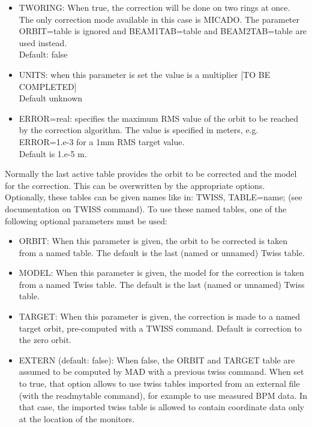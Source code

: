 \begin{itemize}
   \item TWORING: When true, the correction will be done on two rings at
     once. The only correction mode available in this case is
     MICADO. The parameter ORBIT=table is ignored and BEAM1TAB=table and
     BEAM2TAB=table are used instead.  
     \\ Default: false \\

   \item UNITS: when this parameter is set the value is a multiplier [TO BE COMPLETED] 
     \\ Default unknown \\

   \item ERROR=real: specifies the maximum RMS value of the orbit to
     be reached by the correction algorithm. The value is specified in
     meters, e.g. ERROR=1.e-3 for a 1mm RMS target value. \\ Default is
     1.e-5 m.\\

\end{itemize}

Normally the last active table provides the orbit to be
corrected and the model for the correction. This can be overwritten
by the appropriate options. Optionally, these tables can be given
names like in:  TWISS, TABLE=name; (see documentation on TWISS
command). To use these named tables, one of the following optional
parameters must be  used:  

\begin{itemize}
   \item ORBIT: When this parameter is given, the orbit to be corrected
     is taken from a named table. The default is the last (named or
     unnamed) Twiss table.  

   \item MODEL: When this parameter is given, the model for the
     correction is taken from a named Twiss table. The default is the
     last (named or unnamed) Twiss table.  

   \item TARGET: When this parameter is given, the correction is made to
     a named target orbit, pre-computed with a TWISS command. Default is
     correction to the zero orbit.  

   \item EXTERN (default: false): When false, the ORBIT and TARGET table
     are assumed to be computed by MAD with a previous twiss
     command. When set to true, that option allows to use twiss tables
     imported from an external file (with the readmytable command), for
     example to use measured BPM data. In that case, the imported twiss
     table is allowed to contain coordinate data only at the location of
     the monitors.  
\end{itemize}

